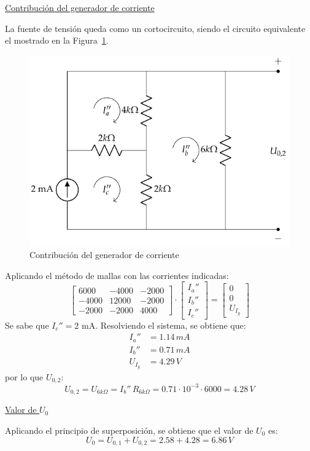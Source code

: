 \begin{example}
    \underline{Contribución del generador de corriente}
    
    La fuente de tensión queda como un cortocircuito, siendo el circuito equivalente el mostrado en la Figura~\ref{fig.ej_superposicion_cc_corriente}. 
    \begin{figure}[H]
        \centering
        \includegraphics[width=0.4\linewidth]{../figs/ej_superposicion_cc_corriente.pdf}
        \caption{Contribución del generador de corriente}
        \label{fig.ej_superposicion_cc_corriente}
    \end{figure}
    
    Aplicando el método de mallas con las corrientes indicadas:
    \begin{equation*}
        \begin{bmatrix}
            6000 & -4000 & -2000\\
            -4000 & 12000 & -2000\\
            -2000 & -2000 & 4000
        \end{bmatrix}
        \cdot
        \begin{bmatrix}
            I_a''\\
            I_b''\\
            I_c''
        \end{bmatrix}
        =
        \begin{bmatrix}
            0\\
            0\\
            U_{I_g}
        \end{bmatrix}
    \end{equation*}
    Se sabe que $I_c''=2$ mA. Resolviendo el sistema, se obtiene que:
    \begin{align*}
        I_a''&=1.14\,mA\\
        I_b''&=0.71\,mA\\
        U_{I_g}&=4.29\,V
    \end{align*}
    por lo que $U_{0,2}$:
    \begin{equation*}
        U_{0,2}=U_{6k\Omega}=I_b''\, R_{6k\Omega}=0.71\cdot 10^{-3}\cdot 6000= 4.28\,V
    \end{equation*}
    
    \underline{Valor de $U_0$}
    
    Aplicando el principio de superposición, se obtiene que el valor de $U_0$ es:
    \begin{equation*}
        U_0=U_{0,1}+U_{0,2}=2.58+4.28=6.86\, V
    \end{equation*}
\end{example}




